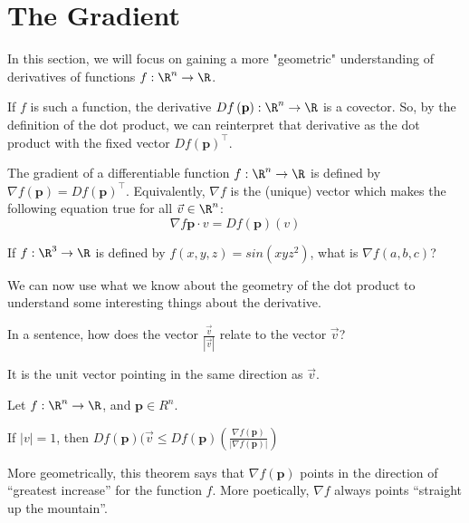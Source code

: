 
\section{The Gradient}

In this section, we will focus on gaining a more "geometric" understanding of derivatives of functions $f:\R^n \to \R$.

If $f$ is such a function, the derivative $Df\left(\mathbf{p}\right) :\R^n \to \R$ is a covector.  So, by the definition of the dot product,
 we can reinterpret that derivative as the dot product with the fixed vector $Df\left(\mathbf{p}\right)^\top$.
 
 \begin{definition}
 	The gradient of a differentiable function $f:\R^n \to \R$ is defined by $\nabla f (\mathbf{p})= Df\left(\mathbf{p}\right)^\top$.
 	Equivalently, $\nabla f$ is the (unique) vector which makes the following equation true for all $\vec{v} \in \R^n$:
 	\[ \nabla f\mathbf{p} \cdot v = Df(\mathbf{p})(v)\] 
 \end{definition}
 
 \begin{question}
 	If $f:\R^3 \to \R$ is defined by $f(x,y,z) = sin(xyz^2)$, what is $\nabla f(a,b,c)$?
 \end{question}
 
 We can now use what we know about the geometry of the dot product to understand some interesting things about the derivative.
 
 \begin{question}
 	In a sentence, how does the vector $\frac{\vec{v}}{|\vec{v}|}$ relate to the vector $\vec{v}$?
 	\begin{answer}
 		It is the unit vector pointing in the same direction as  $\vec{v}$. 
 	\end{answer}
 \end{question}
 
 \begin{theorem}
 	Let $f:\R^n \to \R$, and $\mathbf{p}\in R^n$. 
 	
 	If $\left|v\right| = 1$, then $Df(\mathbf{p})(\vec{v}\leq Df(\mathbf{p})( \frac{\nabla f (\mathbf{p})}{|\nabla f (\mathbf{p})|})$
 \end{theorem}

	More geometrically, this theorem says that $\nabla f(\mathbf{p})$ points in the direction of  ``greatest increase'' for the function $f$.
	More poetically, $\nabla f$ always points ``straight up the mountain''.
	
